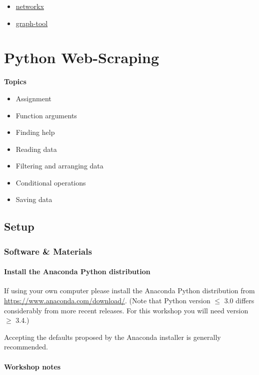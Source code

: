 \documentclass[]{book}
\providecommand{\tightlist}{%
  \setlength{\itemsep}{0pt}\setlength{\parskip}{0pt}}
\begin{document}
\begin{itemize}
  \begin{itemize}
  \tightlist
  \item
    \href{https://networkx.github.io/}{networkx}
  \item
    \href{https://graph-tool.skewed.de/}{graph-tool}
  \end{itemize}
\end{itemize}

\chapter{Python Web-Scraping}\label{python-web-scraping}

\textbf{Topics}

\begin{itemize}
\tightlist
\item
  Assignment
\item
  Function arguments
\item
  Finding help
\item
  Reading data
\item
  Filtering and arranging data
\item
  Conditional operations
\item
  Saving data
\end{itemize}

\section{Setup}\label{setup-5}

\subsection{Software \& Materials}\label{software-materials-5}

\subsubsection{Install the Anaconda Python
distribution}\label{install-the-anaconda-python-distribution-1}

If using your own computer please install the Anaconda Python
distribution from \url{https://www.anaconda.com/download/}. (Note that
Python version \(\leq\) 3.0 differs considerably from more recent
releases. For this workshop you will need version \(\geq\) 3.4.)

Accepting the defaults proposed by the Anaconda installer is generally
recommended.

\subsubsection{Workshop notes}\label{workshop-notes}
\end{document}
